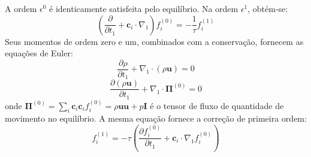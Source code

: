 A ordem $\epsilon^0$ é identicamente satisfeita pelo equilíbrio.
Na ordem $\epsilon^1$, obtém-se:
\begin{equation}
    \left( \frac{\partial}{\partial t_1} + \mathbf{c}_i \cdot \nabla_1 \right) f_i^{(0)} = -\frac{1}{\tau} f_i^{(1)}
\end{equation}
Seus momentos de ordem zero e um, combinados com a conservação, fornecem as equações de Euler:
\begin{equation}
    \frac{\partial \rho}{\partial t_1} + \nabla_1 \cdot (\rho \mathbf{u}) = 0
\end{equation}
\begin{equation}
    \frac{\partial (\rho \mathbf{u})}{\partial t_1} + \nabla_1 \cdot \boldsymbol{\Pi}^{(0)} = 0
\end{equation}
onde $\boldsymbol{\Pi}^{(0)} = \sum_i \mathbf{c}_i \mathbf{c}_i f_i^{(0)} = \rho \mathbf{u}\mathbf{u} + p\mathbf{I}$ é o tensor de fluxo de quantidade de movimento no equilíbrio.
A mesma equação fornece a correção de primeira ordem:
\begin{equation}\label{eq:fi1-solucao}
    f_i^{(1)} = -\tau \left( \frac{\partial f_i^{(0)}}{\partial t_1} + \mathbf{c}_i \cdot \nabla_1 f_i^{(0)} \right)
\end{equation}

